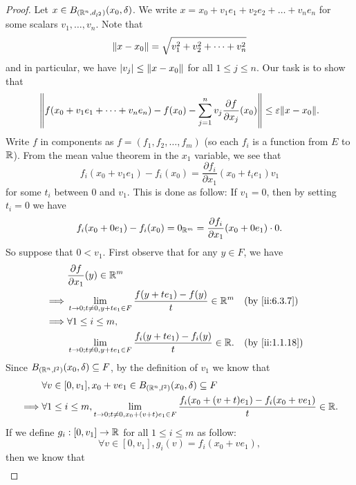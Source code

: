 \begin{proof}
  Let \(x \in B_{(\R^n, d_{l^2})}(x_0, \delta)\).
  We write \(x = x_0 + v_1 e_1 + v_2 e_2 + \dots + v_n e_n\) for some scalars \(v_1, \dots, v_n\).
  Note that
  \[
    \norm*{x - x_0} = \sqrt{v_1^2 + v_2^2 + \dots + v_n^2}
  \]
  and in particular, we have \(\abs{v_j} \leq \norm*{x - x_0}\) for all \(1 \leq j \leq n\).
  Our task is to show that
  \[
    \norm*{f(x_0 + v_1 e_1 + \dots + v_n e_n) - f(x_0) - \sum_{j = 1}^n v_j \dfrac{\partial f}{\partial x_j}(x_0)} \leq \varepsilon \norm*{x - x_0}.
  \]
  Write \(f\) in components as \(f = (f_1 , f_2, \dots, f_m)\)
  (so each \(f_i\) is a function from \(E\) to \(\R\)).
  From the mean value theorem in the \(x_1\) variable, we see that
  \[
    f_i(x_0 + v_1 e_1) - f_i(x_0) = \dfrac{\partial f_i}{\partial x_1}(x_0 + t_i e_1) v_1
  \]
  for some \(t_i\) between \(0\) and \(v_1\).
  This is done as follow:
  If \(v_1 = 0\), then by setting \(t_i = 0\) we have
  \[
    f_i(x_0 + 0 e_1) - f_i(x_0) = 0_{\R^m} = \dfrac{\partial f_i}{\partial x_1}(x_0 + 0 e_1) \cdot 0.
  \]
  So suppose that \(0 < v_1\).
  First observe that for any \(y \in F\), we have
  \begin{align*}
             & \dfrac{\partial f}{\partial x_1}(y) \in \R^m                                                              \\
    \implies & \lim_{t \to 0 ; t \neq 0, y + t e_1 \in F} \dfrac{f(y + t e_1) - f(y)}{t} \in \R^m    &  & \by{ii:6.3.7}  \\
    \implies & \forall 1 \leq i \leq m,                                                                                  \\
             & \lim_{t \to 0 ; t \neq 0, y + t e_1 \in F} \dfrac{f_i(y + t e_1) - f_i(y)}{t} \in \R. &  & \by{ii:1.1.18}
  \end{align*}
  Since \(B_{(\R^n, l^2)}(x_0, \delta) \subseteq F\), by the definition of \(v_1\) we know that
  \begin{align*}
             & \forall v \in [0, v_1], x_0 + v e_1 \in B_{(\R^n, l^2)}(x_0, \delta) \subseteq F                                                         \\
    \implies & \forall 1 \leq i \leq m, \lim_{t \to 0 ; t \neq 0, x_0 + (v + t) e_1 \in F} \dfrac{f_i(x_0 + (v + t) e_1) - f_i(x_0 + v e_1)}{t} \in \R.
  \end{align*}
  If we define \(g_i : [0, v_1] \to \R\) for all \(1 \leq i \leq m\) as follow:
  \[
    \forall v \in [0, v_1], g_i(v) = f_i(x_0 + v e_1),
  \]
  then we know that
  \begin{align*}

\end{align*}
\end{proof}
